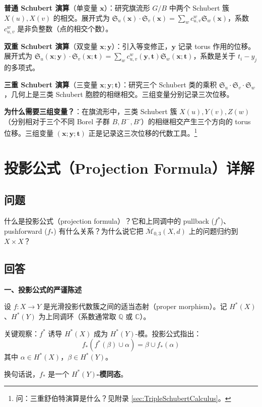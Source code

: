 \textbf{普通 Schubert 演算}（单变量 $\mathbf{x}$）：研究旗流形 $G/B$ 中两个 Schubert 簇 $X(u), X(v)$ 的相交。展开式为 $\mathfrak{S}_u(\mathbf{x}) \cdot \mathfrak{S}_v(\mathbf{x}) = \sum_w c_{u,v}^w \mathfrak{S}_w(\mathbf{x})$，系数 $c_{u,v}^w$ 是非负整数（点的相交个数）。

\textbf{双重 Schubert 演算}（双变量 $\mathbf{x}; \mathbf{y}$）：引入等变修正，$\mathbf{y}$ 记录 torus 作用的位移。展开式为 $\mathfrak{S}_u(\mathbf{x};\mathbf{y}) \cdot \mathfrak{S}_v(\mathbf{x};\mathbf{t}) = \sum_w c_{u,v}^w(\mathbf{y},\mathbf{t}) \mathfrak{S}_w(\mathbf{x};\mathbf{t})$，系数是关于 $t_i - y_j$ 的多项式。

\textbf{三重 Schubert 演算}（三变量 $\mathbf{x}; \mathbf{y}; \mathbf{t}$）：研究三个 Schubert 类的乘积 $\mathfrak{S}_u \cdot \mathfrak{S}_v \cdot \mathfrak{S}_w$，几何上是三类 Schubert 胞腔的相继相交。三组变量分别记录三次位移。

\textbf{为什么需要三组变量？}：在旗流形中，三类 Schubert 簇 $X(u), Y(v), Z(w)$（分别相对于三个不同 Borel 子群 $B, B^-, B'$）的相继相交产生三个方向的 torus 位移。三组变量 $(\mathbf{x}; \mathbf{y}; \mathbf{t})$ 正是记录这三次位移的代数工具。\footnote{问：三重舒伯特演算是什么？见附录 \cref{sec:TripleSchubertCalculus}。}

\section{投影公式（Projection Formula）详解}\label{sec:ProjectionFormula}
\subsection{问题}
什么是投影公式（projection formula）？它和上同调中的 pullback ($f^*$)、pushforward ($f_*$) 有什么关系？为什么说它把 $\overline{\mathcal{M}}_{0,3}(X,d)$ 上的问题归约到 $X \times X$？

\subsection{回答}
\textbf{一、投影公式的严谨陈述}

设 $f: X \to Y$ 是光滑投影代数簇之间的适当态射（proper morphism）。记 $H^*(X)$、$H^*(Y)$ 为上同调环（系数通常取 $\mathbb{Q}$ 或 $\mathbb{C}$）。

关键观察：$f^*$ 诱导 $H^*(X)$ 成为 $H^*(Y)$-模。投影公式指出：
$$f_*(f^*(\beta) \cup \alpha) = \beta \cup f_*(\alpha)$$
其中 $\alpha \in H^*(X)$，$\beta \in H^*(Y)$。

换句话说，$f_*$ 是一个 \textbf{$H^*(Y)$-模同态}。

